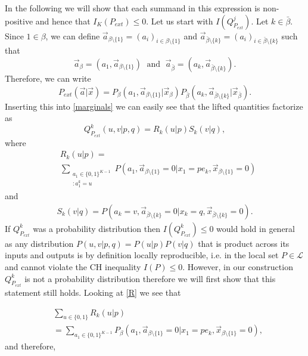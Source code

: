 \documentclass[pra,aps,reprint,superscriptaddress]{revtex4-2}
\theoremstyle{theorem}
\begin{document}
In the following we will show that each summand in this expression is non-positive and hence that $I_K\left(P_{ext}\right) \leq 0$. 
Let us start with $I\left(Q^j_{P_{ext}}\right)$. Let $k\in \bar \beta$. Since $1\in \beta$, we can define $\vec a_{\beta \setminus \{1\}} = (a_i)_{i\in \beta \setminus \{1\}}$ and $\vec a_{\bar \beta \setminus \{k\}}=(a_i)_{i\in \bar \beta \setminus \{k\}}$ such that
\begin{equation}
    \vec a_{\beta} = (a_1,\vec a_{\beta \setminus \{1\}})\;\text{ and }\;
    \vec a_{\bar \beta} = (a_k,\vec a_{\bar \beta \setminus \{k\}}).
\end{equation}
Therefore, we can write
\begin{equation}
    P_{ext}(\vec a| \vec x) = P_\beta(a_1,\vec a_{\beta \setminus \{1\}}|\vec x_{\beta})P_{\bar \beta} (a_k,\vec a_{\bar \beta \setminus \{k\}}|\vec x_{\bar \beta}).
\end{equation}
Inserting this into \eqref{marginals} we can easily see that the lifted quantities factorize as
\begin{equation}\label{factorize}
    Q^k_{P_{ext}}(u,v|p,q) = R_k(u|p)S_k(v|q),
\end{equation}
where
\begin{align}\label{R}
&R_k(u|p)=\\&\sum_{\substack{a_1\in\{0,1\}^{K-1}\\:a_1^k=u}}P\left(a_1,\vec a_{\beta \setminus \{1\}}=0|x_1=pe_k,\vec x_{\beta \setminus \{1\}}=0\right)\nonumber
\end{align}
and
\begin{align}\label{S}
S_k(v|q)=P\left(a_k=v,\vec a_{\bar \beta \setminus \{k\}}=0|x_{k}=q,\vec x_{\bar \beta \setminus \{k\}}=0\right).
\end{align}
If $Q^k_{P_{ext}}$ was a probability distribution then $I(Q^k_{P_{ext}})\leq 0$ would hold in general as any distribution $P(u,v|p,q)=P(u|p)P(v|q)$ that is product across its inputs and outputs is by definition locally reproducible, i.e. in the local set $P\in \mathcal{L}$ and cannot violate the CH inequality $I(P)\leq 0$. However, in our construction $Q^k_{P_{ext}}$ is not a probability distribution therefore we will first show that this statement still holds. Looking at \eqref{R} we see that

\begin{align}
    &\sum_{u\in\{0,1\}}R_k(u|p) \\&= \sum_{a_1\in\{0,1\}^{K-1}}P_{\beta}\left( a_1,\vec a_{\beta \setminus \{1\}}=0|x_1=pe_k,\vec x_{\beta \setminus \{1\}}=0\right),\nonumber
\end{align}
and therefore,
\end{document}
